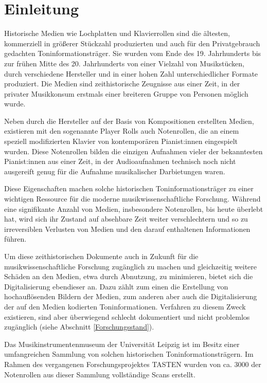 \section{Einleitung}

Historische Medien wie Lochplatten und Klavierrollen sind die ältesten, kommerziell in größerer Stückzahl produzierten und auch für den Privatgebrauch gedachten Toninformationsträger.
Sie wurden vom Ende des 19. Jahrhunderts bis zur frühen Mitte des 20. Jahrhunderts von einer Vielzahl von Musikstücken, durch verschiedene Hersteller und in einer hohen Zahl unterschiedlicher Formate produziert.
Die Medien sind zeithistorische Zeugnisse aus einer Zeit, in der privater Musikkonsum erstmals einer breiteren Gruppe von Personen möglich wurde.

Neben durch die Hersteller auf der Basis von Kompositionen erstellten Medien, existieren mit den sogenannte Player Rolls auch Notenrollen, die an einem speziell modifizierten Klavier von kontemporären Pianist:innen eingespielt wurden.
Diese Notenrollen bilden die einzigen Aufnahmen vieler der bekanntesten Pianist:innen aus einer Zeit, in der Audioaufnahmen technisch noch nicht ausgereift genug für die Aufnahme musikalischer Darbietungen waren.

Diese Eigenschaften machen solche historischen Toninformationsträger zu einer wichtigen Ressource für die moderne musikwissenschaftliche Forschung.
Während eine signifikante Anzahl von Medien, insbesondere Notenrollen, bis heute überlebt hat, wird sich ihr Zustand auf absehbare Zeit weiter verschlechtern und so zu irreversiblen Verlusten von Medien und den darauf enthaltenen Informationen führen.

Um diese zeithistorischen Dokumente auch in Zukunft für die musikwissenschaftliche Forschung zugänglich zu machen und gleichzeitig weitere Schäden an den Medien, etwa durch Abnutzung, zu minimieren, bietet sich die Digitalisierung ebendieser an.
Dazu zählt zum einen die Erstellung von hochauflösenden Bildern der Medien, zum anderen aber auch die Digitalisierung der auf den Medien kodierten Toninformationen.
Verfahren zu diesem Zweck existieren, sind aber überwiegend schlecht dokumentiert und nicht problemlos zugänglich (siehe Abschnitt \ref{Forschungsstand}).

Das Musikinstrumentenmuseum der Universität Leipzig ist im Besitz einer umfangreichen Sammlung von solchen historischen Toninformationsträgern.
Im Rahmen des vergangenen Forschungsprojektes TASTEN wurden von ca. 3000 der Notenrollen aus dieser Sammlung vollständige Scans erstellt.

